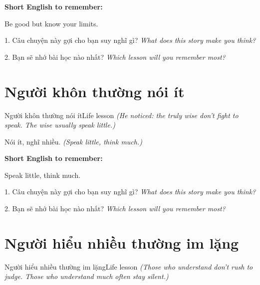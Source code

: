 \begin{ghinhoanh}
\textbf{Short English to remember:}

Be good but know your limits.

\end{ghinhoanh}

\begin{tuhocnhanh}
1. Câu chuyện này gợi cho bạn suy nghĩ gì? \textit{What does this story make you think?}

2. Bạn sẽ nhớ bài học nào nhất? \textit{Which lesson will you remember most?}
\end{tuhocnhanh}
\ngancach


\section{Người khôn thường nói ít}
\begin{truyen}{Người khôn thường nói ít}{Life lesson}
\textit{(He noticed: the truly wise don't fight to speak. The wise usually speak little.)}
\end{truyen}

\begin{baihoc}
Nói ít, nghĩ nhiều.
\textit{(Speak little, think much.)}
\end{baihoc}

\begin{ghinhoanh}
\textbf{Short English to remember:}

Speak little, think much.

\end{ghinhoanh}

\begin{tuhocnhanh}
1. Câu chuyện này gợi cho bạn suy nghĩ gì? \textit{What does this story make you think?}

2. Bạn sẽ nhớ bài học nào nhất? \textit{Which lesson will you remember most?}
\end{tuhocnhanh}
\ngancach


\section{Người hiểu nhiều thường im lặng}
\begin{truyen}{Người hiểu nhiều thường im lặng}{Life lesson}
\textit{(Those who understand don't rush to judge. Those who understand much often stay silent.)}
\end{truyen}

